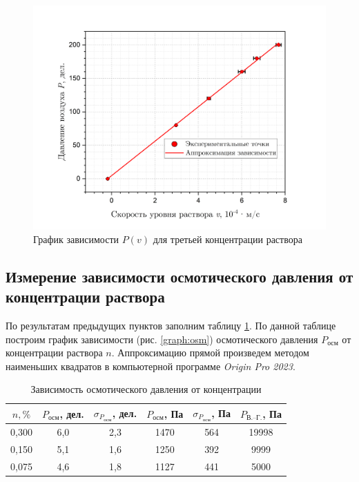 \documentclass[a4paper, 12pt]{article}
\begin{document}
        \begin{figure}[H]
            \centering
            \includegraphics[width = 14 cm]{images/graph_75per.png}
            \caption{График зависимости $P(v)$ для третьей концентрации раствора}
            \label{graph:75per}
        \end{figure}

    \newpage

    \subsection{Измерение зависимости осмотического давления от концентрации раствора}

    \noindent По результатам предыдущих пунктов заполним таблицу \ref{table:osm}. По данной таблице построим график зависимости (рис. \ref{graph:osm}) осмотического давления $P_\text{осм}$ от концентрации раствора $n$. Аппроксимацию прямой произведем методом наименьших квадратов в компьютерной программе \textit{Origin Pro 2023}.

    \begin{table}[H]
        \centering
        \begin{tabular}{|c|c|c|c|c|c|}
        \hline
        $n, \%$ & $P_\text{осм}$, дел. & $\sigma_{P_\text{осм}}$, дел. & $P_\text{осм}$, Па & $\sigma_{P_\text{осм}}$, Па & $P_\text{В.--Г.}$, Па \\ \hline
        0,300 & 6,0 & 2,3 & 1470 & 564 & 19998 \\ \hline
        0,150 & 5,1 & 1,6 & 1250 & 392 & 9999 \\ \hline
        0,075 & 4,6 & 1,8 & 1127 & 441 & 5000 \\ \hline
        \end{tabular}
        \caption{Зависимость осмотического давления от концентрации}
        \label{table:osm}
    \end{table}
\end{document}
